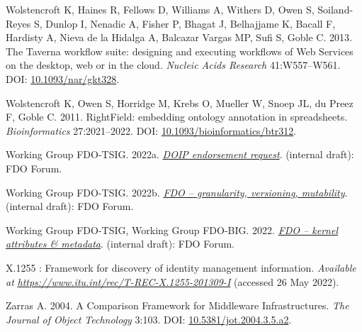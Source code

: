 \begin{CSLReferences}{1}{0}
\leavevmode{}%
Wolstencroft K, Haines R, Fellows D, Williams A, Withers D, Owen S, Soiland-Reyes S, Dunlop I, Nenadic A, Fisher P, Bhagat J, Belhajjame K, Bacall F, Hardisty A, Nieva de la Hidalga A, Balcazar Vargas MP, Sufi S, Goble C. 2013. The Taverna workflow suite: designing and executing workflows of Web Services on the desktop, web or in the cloud. \emph{Nucleic Acids Research} 41:W557--W561. DOI: \href{https://doi.org/10.1093/nar/gkt328}{10.1093/nar/gkt328}.

\leavevmode{}%
Wolstencroft K, Owen S, Horridge M, Krebs O, Mueller W, Snoep JL, du Preez F, Goble C. 2011. RightField: embedding ontology annotation in spreadsheets. \emph{Bioinformatics} 27:2021--2022. DOI: \href{https://doi.org/10.1093/bioinformatics/btr312}{10.1093/bioinformatics/btr312}.

\leavevmode{}%
Working Group FDO-TSIG. 2022a. \emph{\href{https://docs.google.com/document/d/1me0L8C5yDe39cYP1Sxud4Y10hxhphOimLB-K-KgHQUk/edit}{DOIP endorsement request}}. (internal draft): FDO Forum.

\leavevmode{}%
Working Group FDO-TSIG. 2022b. \emph{\href{https://docs.google.com/document/d/1VJTYHxLXIbjHSoFnMEkKaTbpTz9CagoIJyoSafkVh_I/edit}{FDO -- granularity, versioning, mutability}}. (internal draft): FDO Forum.

\leavevmode{}%
Working Group FDO-TSIG, Working Group FDO-BIG. 2022. \emph{\href{https://docs.google.com/document/d/11CuSoNOpg3vYaoHqi4Yg6ncP3qOclJIC/edit}{FDO -- kernel attributes \& metadata}}. (internal draft): FDO Forum.

\leavevmode{}%
X.1255 : Framework for discovery of identity management information. \emph{Available at} \href{https://www.itu.int/rec/T-REC-X.1255-201309-I}{\emph{https://www.itu.int/rec/T-REC-X.1255-201309-I}} (accessed 26 May 2022).

\leavevmode{}%
Zarras A. 2004. A Comparison Framework for Middleware Infrastructures. \emph{The Journal of Object Technology} 3:103. DOI: \href{https://doi.org/10.5381/jot.2004.3.5.a2}{10.5381/jot.2004.3.5.a2}.

\end{CSLReferences}
